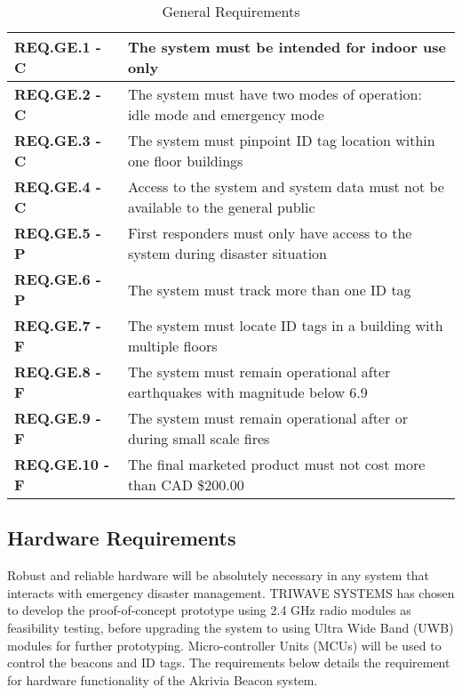 \bgroup
\def\arraystretch{1.5}
\begin{table}[H]
\centering
\begin{tabular}{ | m{3.25cm} | m{12.5cm} |} 
 \hline
 \textbf{REQ.GE.1 - C} & The system must be intended for indoor use only \\ 
\hline
 \textbf{REQ.GE.2 - C} & The system must have two modes of operation: idle mode and emergency mode \\ 
\hline
 \textbf{REQ.GE.3 - C} & The system must pinpoint ID tag location within one floor buildings \\
\hline
 \textbf{REQ.GE.4 - C} & Access to the system and system data must not be available to the general public \\
\hline
 \textbf{REQ.GE.5 - P} & First responders must only have access to the system during disaster situation \\
\hline
 \textbf{REQ.GE.6 - P} & The system must track more than one ID tag \\
\hline
 \textbf{REQ.GE.7 - F} & The system must locate ID tags in a building with multiple floors \\
\hline
 \textbf{REQ.GE.8 - F} & The system must remain operational after earthquakes with magnitude below 6.9 \\
\hline
 \textbf{REQ.GE.9 - F} & The system must remain operational after or during small scale fires \\
\hline
 \textbf{REQ.GE.10 - F} & The final marketed product must not cost more than CAD \$200.00 \\
\hline
\end{tabular}
\caption{General Requirements}
\end{table}	

\break
\subsection{Hardware Requirements}
Robust and reliable hardware will be absolutely necessary in any system that interacts with emergency disaster management. TRIWAVE SYSTEMS has chosen to develop the proof-of-concept prototype using 2.4 GHz radio modules as feasibility testing, before upgrading the system to using Ultra Wide Band (UWB) modules for further prototyping. Micro-controller Units (MCUs) will be used to control the beacons and ID tags. The requirements below details the requirement for hardware functionality of the Akrivia Beacon system.

\bigskip

